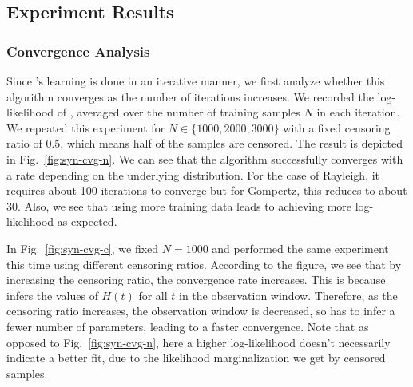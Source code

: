 \subsection{Experiment Results}
\subsubsection{Convergence Analysis}
Since \npglm's learning is done in an iterative manner, we first analyze whether this algorithm converges as the number of iterations increases. We recorded the log-likelihood of \npglm, averaged over the number of training samples $N$ in each iteration. We repeated this experiment for $N\in\{1000,2000,3000\}$ with a fixed censoring ratio of 0.5, which means half of the samples are censored. The result is depicted in Fig.~\ref{fig:syn-cvg-n}. We can see that the algorithm successfully converges with a rate depending on the underlying distribution. For the case of Rayleigh, it requires about 100 iterations to converge but for Gompertz, this reduces to about 30. Also, we see that using more training data leads to achieving more log-likelihood as expected.



In Fig.~\ref{fig:syn-cvg-c}, we fixed $N=1000$ and performed the same experiment this time using different censoring ratios. According to the figure, we see that by increasing the censoring ratio, the convergence rate increases. This is because \npglm infers the values of $H(t)$ for all $t$ in the observation window. Therefore, as the censoring ratio increases, the observation window is decreased, so \npglm has to infer a fewer number of parameters, leading to a faster convergence. Note that as opposed to Fig.~\ref{fig:syn-cvg-n}, here a higher log-likelihood doesn't necessarily indicate a better fit, due to the likelihood marginalization we get by censored samples.


